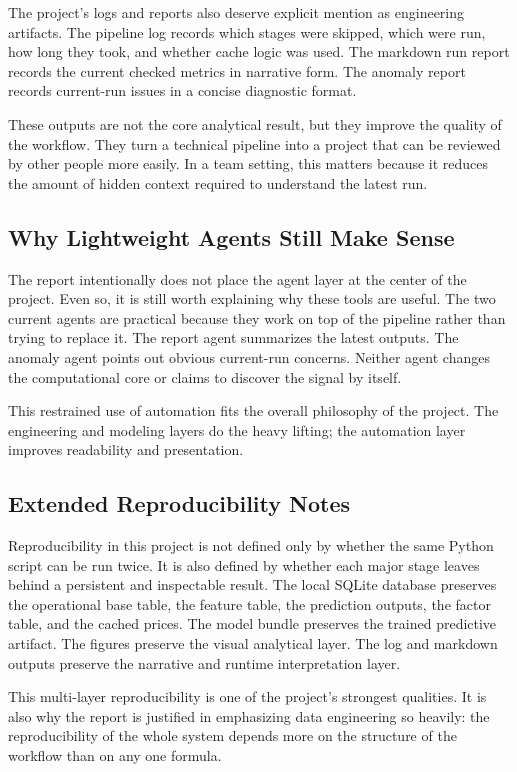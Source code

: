 \documentclass[11pt,a4paper]{article}
\begin{document}
The project’s logs and reports also deserve explicit mention as engineering
artifacts. The pipeline log records which stages were skipped, which were run,
how long they took, and whether cache logic was used. The markdown run report
records the current checked metrics in narrative form. The anomaly report
records current-run issues in a concise diagnostic format.

These outputs are not the core analytical result, but they improve the quality
of the workflow. They turn a technical pipeline into a project that can be
reviewed by other people more easily. In a team setting, this matters because
it reduces the amount of hidden context required to understand the latest run.

\subsection{Why Lightweight Agents Still Make Sense}

The report intentionally does not place the agent layer at the center of the
project. Even so, it is still worth explaining why these tools are useful. The
two current agents are practical because they work on top of the pipeline
rather than trying to replace it. The report agent summarizes the latest
outputs. The anomaly agent points out obvious current-run concerns. Neither
agent changes the computational core or claims to discover the signal by
itself.

This restrained use of automation fits the overall philosophy of the project.
The engineering and modeling layers do the heavy lifting; the automation layer
improves readability and presentation.

\subsection{Extended Reproducibility Notes}

Reproducibility in this project is not defined only by whether the same Python
script can be run twice. It is also defined by whether each major stage leaves
behind a persistent and inspectable result. The local SQLite database preserves
the operational base table, the feature table, the prediction outputs, the
factor table, and the cached prices. The model bundle preserves the trained
predictive artifact. The figures preserve the visual analytical layer. The log
and markdown outputs preserve the narrative and runtime interpretation layer.

This multi-layer reproducibility is one of the project’s strongest qualities.
It is also why the report is justified in emphasizing data engineering so
heavily: the reproducibility of the whole system depends more on the structure
of the workflow than on any one formula.
\end{document}

